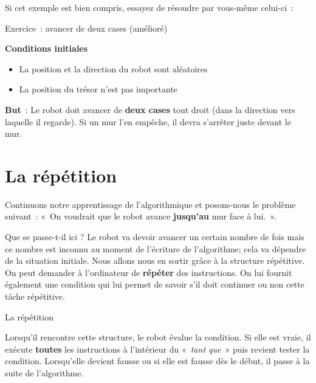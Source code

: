 	Si cet exemple est bien compris, 
	essayez de résoudre par vous-même celui-ci~:

	
	\begin{Emphase}[exercice]{Exercice~: avancer de deux cases (amélioré)}

		\textbf{Conditions initiales}

		\begin{itemize}
		\item La position et la direction du robot sont aléatoires
		\item La position du trésor n'est pas importante
		\end{itemize}
		
		\textbf{But}~: Le robot doit avancer de \textbf{deux cases} tout droit
		(dans la direction vers laquelle il regarde). Si un mur
		l'en empêche, il devra s'arrêter
		juste devant le mur.

	\end{Emphase}

\section{La répétition}

	Continuons notre apprentissage de l'algorithmique et
	posons-nous le problème suivant~: «~On voudrait que le robot avance
	\textbf{jusqu'au} mur face à lui.~».
	
	Que se passe-t-il ici ? Le robot va devoir avancer un certain nombre de
	fois mais ce nombre est inconnu au moment de
	l'écriture de l'algorithme; cela va
	dépendre de la situation initiale. Nous allons nous en sortir grâce à
	la structure répétitive. On peut demander à
	l'ordinateur de \textbf{répéter} des instructions. On
	lui fournit également une condition qui lui permet de savoir
	s'il doit continuer ou non cette tâche répétitive.

	
	\begin{Emphase}[definition]{La répétition}
	\end{Emphase}

	Lorsqu'il rencontre cette structure, le robot évalue la
	condition. Si elle est vraie, il exécute \textbf{toutes} les
	instructions à l'intérieur du «~\textit{tant que~}»
	puis revient tester la condition. Lorsqu'elle devient
	fausse ou si elle est fausse dès le début, il passe à la suite de
	l'algorithme.
	
